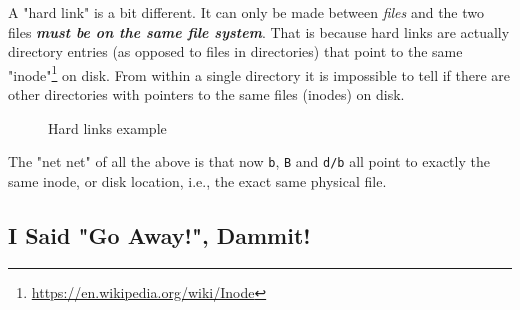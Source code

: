 \documentclass[10pt,american,]{book}
\newenvironment{Shaded}{\begin{snugshade}}{\end{snugshade}}
\newcommand{\KeywordTok}[1]{\textcolor[rgb]{0.13,0.29,0.53}{\textbf{{#1}}}}
\newcommand{\NormalTok}[1]{{#1}}
\renewcommand{\href}[2]{#2\footnote{\url{#1}}}
\numberwithin{figure}{chapter}
\DeclareRobustCommand{\drcap}[1]{\begin{figure}[H]\caption{#1}\end{figure}}
\renewcommand{\KeywordTok}[1]{{#1}}
\renewcommand{\NormalTok}[1]{{#1}}
\begin{document}
A "hard link" is a bit
different. It can only be made between \emph{files} and the two files
\textbf{\emph{must be on the same file system}}. That is because hard
links are actually directory entries (as opposed to files in
directories) that point to the same
\href{https://en.wikipedia.org/wiki/Inode}{"inode"}
on disk. From within a single directory it is impossible to tell if
there are other directories with pointers to the same files (inodes) on
disk.

\drcap{Hard links example}

\begin{Shaded}
\end{Shaded}

The "net net" of all the above is that now \texttt{b}, \texttt{B} and
\texttt{d/b} all point to exactly the same inode, or disk location,
i.e., the exact same physical file.

\subsection*{I Said "Go Away!", Dammit!}\label{i-said-go-away-dammit}
\end{document}
